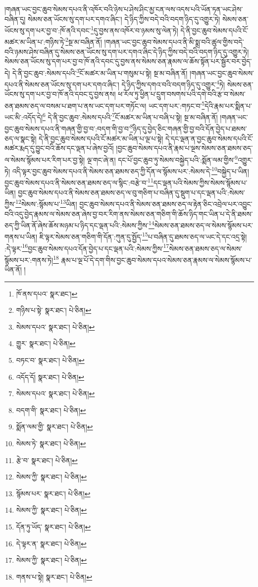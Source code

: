 །གཞན་ཡང་བྱང་ཆུབ་སེམས་དཔའ་ནི་འཁོར་བའི་ཉེས་པ་ཤེས་ཤིང་མྱ་ངན་ལས་འདས་པའི་ཡོན་ཏན་ཡང་ཤེས་བཞིན་དུ། སེམས་ཅན་ཡོངས་སུ་དག་པར་དགའ་ཞིང་། དེ་ཉིད་ཀྱིས་བདེ་བའི་བདག་ཉིད་དུ་འགྱུར་ཏེ། སེམས་ཅན་ཡོངས་སུ་དག་པར་བྱ་བ་:ཁོ་ནའི་དབང་\footnote{ཁོ་ནས་དཔའ་  སྣར་ཐང་། }དུ་བྱས་ནས་འཁོར་བ་ཉམས་སུ་ལེན་ཏེ། དེ་ནི་བྱང་ཆུབ་སེམས་དཔའི་ངོ་མཚར་མ་ཡིན་པ་:གཉིས་ཏེ་\footnote{གཉིས་པ་སྟེ་  སྣར་ཐང་།  པེ་ཅིན། }སྔ་མ་བཞིན་ནོ། །གཞན་ཡང་བྱང་ཆུབ་སེམས་དཔའ་ནི་མི་སྨྲ་བའི་ཚུལ་གྱིས་བདེ་བའི་ཉམས་ཤེས་བཞིན་དུ་སེམས་ཅན་ཡོངས་སུ་དག་པར་དགའ་ཞིང་དེ་ཉིད་ཀྱིས་བདེ་བའི་བདག་ཉིད་དུ་འགྱུར་ཏེ། སེམས་ཅན་ཡོངས་སུ་དག་པར་བྱ་བ་ཁོ་ནའི་དབང་དུ་བྱས་ནས་སེམས་ཅན་རྣམས་ལ་ཆོས་སྟོན་པར་སྦྱོར་བར་བྱེད་དེ། དེ་ནི་བྱང་ཆུབ་:སེམས་དཔའི་\footnote{སེམས་དཔའ་  སྣར་ཐང་།  པེ་ཅིན། }ངོ་མཚར་མ་ཡིན་པ་གསུམ་པ་སྟེ། སྔ་མ་བཞིན་ནོ། །གཞན་ཡང་བྱང་ཆུབ་སེམས་དཔའ་ནི་སེམས་ཅན་ཡོངས་སུ་དག་པར་དགའ་ཞིང་། དེ་ཉིད་ཀྱིས་དགའ་བའི་བདག་ཉིད་དུ་འགྱུར་\footnote{གྱུར་  སྣར་ཐང་།  པེ་ཅིན། }ཏེ། སེམས་ཅན་ཡོངས་སུ་དག་པར་བྱ་བ་ཁོ་ནའི་དབང་དུ་བྱས་ནས། ཕ་རོལ་ཏུ་ཕྱིན་པ་དྲུག་བསགས་པའི་དགེ་བའི་རྩ་བ་སེམས་ཅན་ཐམས་ཅད་ལ་བསམ་པ་ཐག་པ་ནས་ཡང་དག་པར་གཏོང་ལ། ཡང་དག་པར་:གཏང་བ་\footnote{བཏང་བ་  སྣར་ཐང་།  པེ་ཅིན། }དེའི་རྣམ་པར་སྨིན་པ་ཡང་མི་:འདོད་དེ།\footnote{འདོད་དོ།  སྣར་ཐང་།  པེ་ཅིན། } དེ་ནི་བྱང་ཆུབ་:སེམས་དཔའི་\footnote{སེམས་དཔའ་  སྣར་ཐང་།  པེ་ཅིན། }ངོ་མཚར་མ་ཡིན་པ་བཞི་པ་སྟེ། སྔ་མ་བཞིན་ནོ། །གཞན་ཡང་བྱང་ཆུབ་སེམས་དཔའ་ནི་གཞན་གྱི་བྱ་བ་:བདག་གི་བྱ་བ་\footnote{བདག་གི་  སྣར་ཐང་།  པེ་ཅིན། }ཉིད་དུ་བྱེད་ཅིང་གཞན་གྱི་བྱ་བའི་དོན་བྱེད་པ་ཐམས་ཅད་ལ་སྣང་སྟེ། དེ་ནི་བྱང་ཆུབ་སེམས་དཔའི་ངོ་མཚར་མ་ཡིན་པ་ལྔ་པ་སྟེ། དེ་དང་ལྡན་ན་བྱང་ཆུབ་སེམས་དཔའི་ངོ་མཚར་རྨད་དུ་བྱུང་བའི་ཆོས་དང་ལྡན་པ་ཞེས་བྱའོ། །བྱང་ཆུབ་སེམས་དཔའ་ནི་རྣམ་པ་ལྔས་སེམས་ཅན་ཐམས་ཅད་ལ་སེམས་སྙོམས་པར་རིག་པར་བྱ་སྟེ། ལྔ་གང་ཞེ་ན། དང་པོ་བྱང་ཆུབ་ཏུ་སེམས་བསྐྱེད་པའི་:སྨོན་ལམ་གྱིས་\footnote{སྨོན་ལམ་གྱི་  སྣར་ཐང་།  པེ་ཅིན། }འགྱུར་ཏེ། འདི་ལྟར་བྱང་ཆུབ་སེམས་དཔའ་ནི་སེམས་ཅན་ཐམས་ཅད་ཀྱི་དོན་ལ་སྙོམས་པར་:སེམས་དེ་\footnote{སེམས་ཏེ་  སྣར་ཐང་།  པེ་ཅིན། }བསྐྱེད་པ་ཡིན། བྱང་ཆུབ་སེམས་དཔའ་ནི་སེམས་ཅན་ཐམས་ཅད་ལ་སྙིང་:བརྩེ་བ་\footnote{རྩེ་བ་  སྣར་ཐང་།  པེ་ཅིན། }དང་ལྡན་པའི་སེམས་ཀྱིས་སེམས་སྙོམས་པ་ཡིན། བྱང་ཆུབ་སེམས་དཔའ་ནི་སེམས་ཅན་ཐམས་ཅད་ལ་བུ་གཅིག་པ་བཞིན་དུ་སྡུག་པ་དང་ལྡན་པའི་:སེམས་ཀྱིས་\footnote{སེམས་ཀྱི་  སྣར་ཐང་།  པེ་ཅིན། }སེམས་:སྙོམས་པ་\footnote{སྙོམས་པར་  སྣར་ཐང་།  པེ་ཅིན། }ཡིན། བྱང་ཆུབ་སེམས་དཔའ་ནི་སེམས་ཅན་ཐམས་ཅད་ལ་རྟེན་ཅིང་འབྲེལ་པར་འབྱུང་བའི་འདུ་བྱེད་རྣམས་ལ་སེམས་ཅན་ཞེས་བྱ་བར་རིག་ནས་སེམས་ཅན་གཅིག་གི་ཆོས་ཉིད་གང་ཡིན་པ་དེ་ནི་ཐམས་ཅད་ཀྱི་ཡིན་ནོ་ཞེས་ཆོས་མཉམ་པ་ཉིད་དང་ལྡན་པའི་:སེམས་ཀྱིས་\footnote{སེམས་ཀྱི་  སྣར་ཐང་།  པེ་ཅིན། }སེམས་ཅན་ཐམས་ཅད་ལ་སེམས་སྙོམས་པར་གནས་པ་ཡིན། ཇི་ལྟར་སེམས་ཅན་གཅིག་གི་དོན་:ཀུན་དུ་སྤྱོད་\footnote{དོན་ཏུ་ཡོད་  སྣར་ཐང་།  པེ་ཅིན། }པ་བཞིན་དུ་ཐམས་ཅད་ལ་ཡང་དེ་དང་འདྲ་སྟེ། :དེ་ལྟར་\footnote{དེ་ལྟར་ན་  སྣར་ཐང་།  པེ་ཅིན། }བྱང་ཆུབ་སེམས་དཔའ་དོན་བྱེད་པ་དང་ལྡན་པའི་:སེམས་ཀྱིས་\footnote{སེམས་ཀྱི་  སྣར་ཐང་།  པེ་ཅིན། }སེམས་ཅན་ཐམས་ཅད་ལ་སེམས་སྙོམས་པར་:གནས་ཏེ།\footnote{གནས་པ་སྟེ།  སྣར་ཐང་།  པེ་ཅིན། } རྣམ་པ་ལྔ་པོ་དེ་དག་གིས་བྱང་ཆུབ་སེམས་དཔའ་སེམས་ཅན་རྣམས་ལ་སེམས་སྙོམས་པ་ཡིན་ནོ། །
